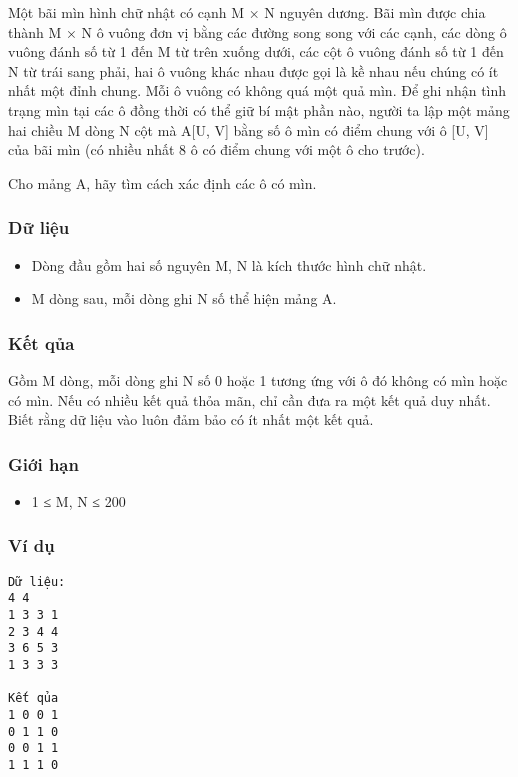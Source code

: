 



   Một bãi mìn hình chữ nhật có cạnh M × N nguyên dương. Bãi mìn được chia thành M × N ô vuông đơn vị bằng các đường song song với các cạnh,   các dòng ô vuông đánh số từ 1 đến M từ trên xuống dưới, các cột ô vuông đánh số từ 1 đến N từ trái sang phải, hai ô vuông khác nhau được gọi là kề   nhau nếu chúng có ít nhất một đỉnh chung. Mỗi ô vuông có không quá một quả mìn. Để ghi nhận tình trạng mìn tại các ô đồng thời có thể giữ bí mật phần   nào, người ta lập một mảng hai chiều M dòng N cột mà A[U, V] bằng số ô mìn có điểm chung với ô [U, V] của bãi mìn (có nhiều nhất 8 ô có điểm   chung với một ô cho trước).  

   Cho mảng A, hãy tìm cách xác định các ô có mìn.  

\subsubsection{   Dữ liệu  }
\begin{itemize}
	\item     Dòng đầu gồm hai số nguyên M, N là kích thước hình chữ nhật.   
	\item     M dòng sau, mỗi dòng ghi N số thể hiện mảng A.   
\end{itemize}

\subsubsection{   Kết qủa  }

   Gồm M dòng, mỗi dòng ghi N số 0 hoặc 1 tương ứng với ô đó không có mìn hoặc có mìn. Nếu có nhiều kết quả thỏa mãn, chỉ cần đưa ra một kết   quả duy nhất. Biết rằng dữ liệu vào luôn đảm bảo có ít nhất một kết quả.  

\subsubsection{   Giới hạn  }
\begin{itemize}
	\item     1 ≤ M, N ≤ 200   
\end{itemize}

\subsubsection{   Ví dụ  }
\begin{verbatim}
Dữ liệu:
4 4
1 3 3 1
2 3 4 4
3 6 5 3
1 3 3 3

Kết qủa
1 0 0 1
0 1 1 0
0 0 1 1
1 1 1 0
\end{verbatim}